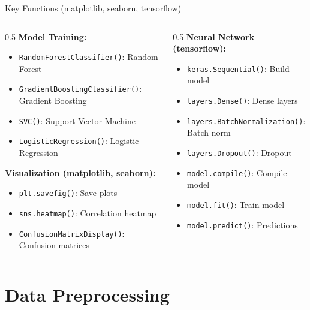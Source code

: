 \documentclass[aspectratio=169]{beamer}
\begin{document}
\begin{frame}{Key Functions (matplotlib, seaborn, tensorflow)}
\begin{columns}
\begin{column}{0.5\textwidth}
\textbf{Model Training:}
\begin{itemize}
    \item \texttt{RandomForestClassifier()}: Random Forest
    \item \texttt{GradientBoostingClassifier()}: Gradient Boosting
    \item \texttt{SVC()}: Support Vector Machine
    \item \texttt{LogisticRegression()}: Logistic Regression
\end{itemize}
\textbf{Visualization (matplotlib, seaborn):}
\begin{itemize}
    \item \texttt{plt.savefig()}: Save plots
    \item \texttt{sns.heatmap()}: Correlation heatmap
    \item \texttt{ConfusionMatrixDisplay()}: Confusion matrices
\end{itemize}
\end{column}
\begin{column}{0.5\textwidth}
\textbf{Neural Network (tensorflow):}
\begin{itemize}
    \item \texttt{keras.Sequential()}: Build model
    \item \texttt{layers.Dense()}: Dense layers
    \item \texttt{layers.BatchNormalization()}: Batch norm
    \item \texttt{layers.Dropout()}: Dropout
    \item \texttt{model.compile()}: Compile model
    \item \texttt{model.fit()}: Train model
    \item \texttt{model.predict()}: Predictions
\end{itemize}
\end{column}
\end{columns}
\end{frame}

\section{Data Preprocessing}
\end{document}
